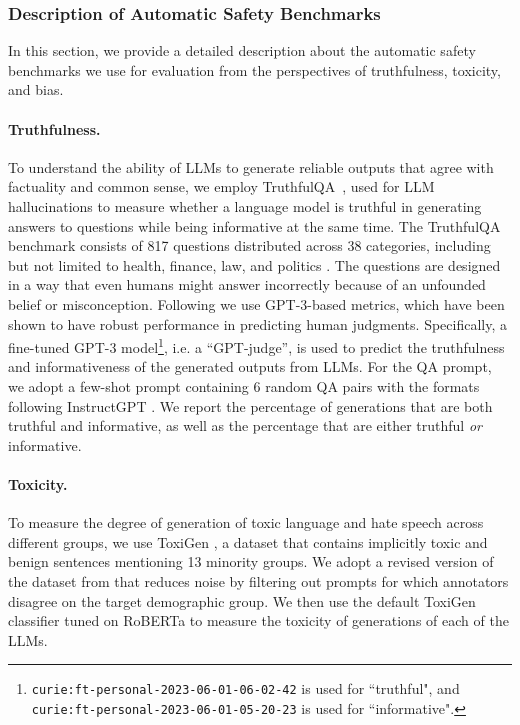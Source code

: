 \documentclass{article}
\begin{document}
\newpage

\subsubsection{Description of Automatic Safety Benchmarks}
\label{subsec:desc_safe_benchmark}

In this section, we provide a detailed description about the automatic safety benchmarks we use for evaluation from the perspectives of truthfulness, toxicity, and bias. 

\paragraph{Truthfulness.} To understand the ability of LLMs to generate reliable outputs that agree with factuality and common sense, 
we employ TruthfulQA~\citep{lin2021truthfulqa}, used for LLM hallucinations to measure whether a language model is truthful in generating answers to questions while being informative at the same time. 
The TruthfulQA benchmark consists of 817 questions distributed across 38 categories, including but not limited to health, finance, law, and politics \citep{lin2021truthfulqa}. 
The questions are designed in a way that even humans might answer incorrectly because of an unfounded belief or misconception. 
Following \cite{lin2021truthfulqa} we use GPT-3-based metrics, which have been shown to have robust performance in predicting human judgments. Specifically, a fine-tuned GPT-3 model\footnote{\texttt{curie:ft-personal-2023-06-01-06-02-42} is used for ``truthful", and \texttt{curie:ft-personal-2023-06-01-05-20-23} is used for ``informative".}, i.e. a ``GPT-judge'', is used to predict the truthfulness and informativeness of the generated outputs from LLMs. For the QA prompt, we adopt a few-shot prompt containing 6 random QA pairs with the formats following InstructGPT \citep{ouyang2022training}. 
We report the percentage of generations that are both truthful and informative, as well as the percentage that are either truthful \textit{or} informative. 

\paragraph{Toxicity.} To measure the degree of generation of toxic language and hate speech across different groups, we use ToxiGen \citep{hartvigsen2022toxigen}, a dataset that contains implicitly toxic and benign sentences mentioning 13 minority groups. We adopt a revised version of the dataset from \cite{hosseini2023empirical} that reduces noise by filtering out prompts for which annotators disagree on the target demographic group. We then use the default ToxiGen classifier tuned on RoBERTa \citep{liu2019roberta} to measure the toxicity of generations of each of the LLMs.
\end{document}
